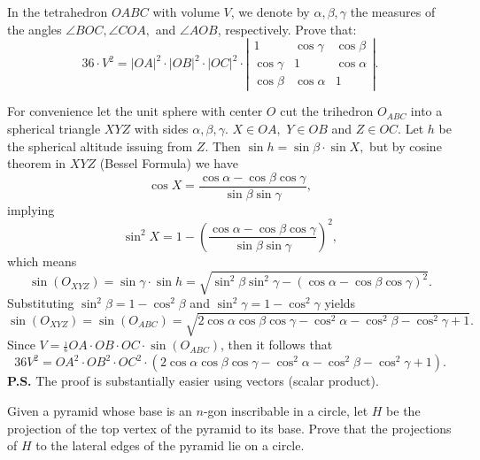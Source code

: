 \begin{question}
	In the tetrahedron $OABC$ with volume $V$, we denote by $\alpha,\beta,\gamma$ the measures of the angles $\angle BOC,\angle COA,$ and $\angle AOB$, respectively. Prove that:
	\[36\cdot V^{2}=|OA|^{2}\cdot |OB|^{2}\cdot |OC|^{2}\cdot \left|\begin{array}{ccc}1&{\cos\gamma}&{\cos\beta}\\ {\cos\gamma}&1&{\cos\alpha}\\ {\cos\beta}&{\cos\alpha}&1\end{array}\right| .\]
\end{question}





\begin{solution}[name={Solution by Luis González}] 
	For convenience let the unit sphere with center $O$ cut the trihedron $O_{ABC}$ into a spherical triangle $XYZ$ with sides $\alpha,\beta,\gamma.$ $X \in OA,$ $Y \in OB$ and $Z \in OC.$ Let $h$ be the spherical altitude issuing from $Z.$ Then $\sin h=\sin \beta \cdot \sin X,$ but by cosine theorem in $XYZ$ (Bessel Formula) we have
	\[\cos X=\frac{\cos \alpha- \cos \beta \cos \gamma}{\sin \beta \sin \gamma},\]
	implying
	\[\sin^2 X=1-\left (\frac{\cos \alpha- \cos \beta \cos \gamma}{\sin \beta \sin \gamma} \right)^2,\]
	which means
	\[\sin (O_{XYZ})= \sin \gamma \cdot \sin h=\sqrt{ \sin^2 \beta \sin^2 \gamma-(\cos \alpha- \cos \beta \cos \gamma)^2}.\]
	Substituting $\sin^2 \beta=1- \cos^2 \beta$ and $\sin^2 \gamma=1- \cos^2 \gamma$ yields
	\[\sin (O_{XYZ})=\sin (O_{ABC})= \sqrt{2\cos \alpha \cos \beta \cos \gamma- \cos^2 \alpha-\cos^2 \beta-\cos^2 \gamma+1}.\]
	Since $V=\frac{_1}{^6} OA \cdot OB \cdot OC \cdot \sin (O_{ABC})$, then it follows that
	\[36V^2=OA^2 \cdot OB^2 \cdot OC^2 \cdot (2\cos \alpha \cos \beta \cos \gamma- \cos^2 \alpha-\cos^2 \beta-\cos^2 \gamma+1).\]
	\textbf{P.S.} The proof is substantially easier using vectors (scalar product).
\end{solution}






\begin{question}
	Given a pyramid whose base is an $n$-gon inscribable in a circle, let $H$ be the projection of the top vertex of the pyramid to its base. Prove that the projections of $H$ to the lateral edges of the pyramid lie on a circle.
\end{question}





